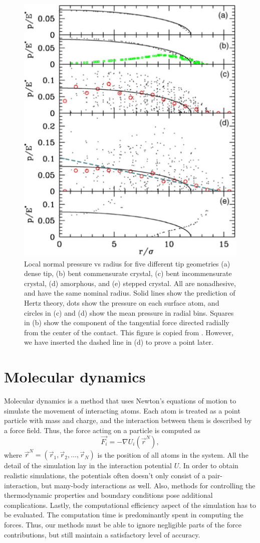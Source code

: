\documentclass[twoside,english]{uiofysmaster}
\begin{document}
\begin{figure}[H]
\centering
\includegraphics[width=0.5\linewidth]{figures/Robbins/results2}
\caption{Local normal pressure vs radius for five
	different tip geometries (a) dense tip, (b) bent commensurate crystal, (c) bent incommensurate crystal, (d) amorphous, and (e) stepped crystal. All are nonadhesive, and have the same nominal radius.
	Solid lines	show the prediction of Hertz theory, dots show the pressure on each surface atom, and circles in (c) and (d) show the mean pressure in radial bins. Squares in (b) show the component of the tangential force directed radially from the center of the contact.
	This figure is copied from \cite{RobbinsSingleAsperity}. However, we have inserted the dashed line in (d) to prove a point later.}
\label{fig:robbinsResults}
\end{figure}




  



\chapter{Molecular dynamics}
Molecular dynamics is a method that uses Newton’s equations of motion to simulate the movement of interacting atoms. 
Each atom is treated as a point particle with mass and charge, and the interaction between them is described by a force field. 
Thus, the force acting on a particle is computed as
\begin{equation}
	\vec{F_i} = -\nabla U_i(\vec{r}^N), \label{MDForce}
\end{equation} 
where $\vec{r}^N=(\vec{r}_1, \vec{r}_2, \dots, \vec{r}_N)$ is the position of all atoms in the system. 
All the detail of the simulation lay in the interaction potential $U$.
In order to obtain realistic simulations, the potentials often doesn't only consist of a pair-interaction, but many-body interactions as well.
Also, methods for controlling the thermodynamic properties and boundary conditions pose additional complications.
Lastly, the computational efficiency aspect of the simulation has to be evaluated. 
The computation time is predominantly spent in computing the forces. 
Thus, our methods must be able to ignore negligible parts of the force contributions, but still maintain a satisfactory level of accuracy. 
\end{document}
